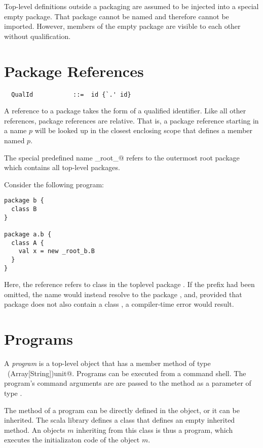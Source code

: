 Top-level definitions outside a packaging are assumed to be injected
into a special empty package. That package cannot be named and
therefore cannot be imported. However, members of the empty package
are visible to each other without qualification.

\section{Package References}

\syntax\begin{lstlisting}
  QualId           ::=  id {`.' id}
\end{lstlisting}
A reference to a package takes the form of a qualified identifier.
Like all other references, package references are relative. That is, 
a package reference starting in a name $p$ will be looked up in the
closest enclosing scope that defines a member named $p$.

The special predefined name \lstinline@_root_@  refers to the
outermost root package which contains all top-level packages.  

\example\label{ex:package-ids}
Consider the following program:
\begin{lstlisting}
package b {
  class B 
}

package a.b {
  class A {
    val x = new _root_b.B
  }
}
\end{lstlisting}  
Here, the reference  refers to class  in the
toplevel package . If the  prefix had been
omitted, the name  would instead resolve to the package
, and, provided that package does not also
contain a class , a compiler-time error would result.

\section{Programs}

A {\em program} is a top-level object that has a member method
 of type ~\lstinline@(Array[String])unit@. Programs can be
executed from a command shell. The program's command arguments are are
passed to the  method as a parameter of type
.

The  method of a program can be directly defined in the
object, or it can be inherited. The scala library defines a class
 that defines an empty inherited  method.
An objects $m$ inheriting from this class is thus a program, 
which executes the initializaton code of the object $m$.

